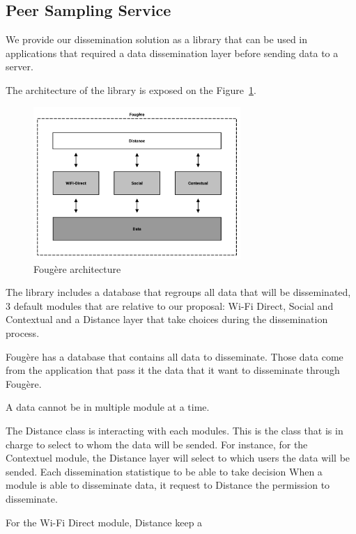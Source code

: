 \subsection{Peer Sampling Service}


We provide our dissemination solution as a library that can be used in applications that required a data dissemination layer before sending data to a server.

The architecture of the library is exposed on the Figure~\ref{Fougere}.

\begin{figure}[h]
	\centering
	\includegraphics[width=0.7\textwidth]{figures/fougere}
	\caption{\label{Fougere} Foug\`ere architecture}
\end{figure}

The library includes a database that regroups all data that will be disseminated, 3 default modules that are relative to our proposal: Wi-Fi Direct, Social and Contextual and a Distance layer that take choices during the dissemination process.

Foug\`ere has a database that contains all data to disseminate.
Those data come from the application that pass it the data that it want to disseminate through Foug\`ere.

A data cannot be in multiple module at a time.

The Distance class is interacting with each modules.
This is the class that is in charge to select to whom the data will be sended.
For instance, for the Contextuel module, the Distance layer will select to which users the data will be sended.
Each 
 dissemination statistique to be able to take decision
When a module is able to disseminate data, it request to Distance the permission to disseminate.

For the Wi-Fi Direct module, Distance keep a 


